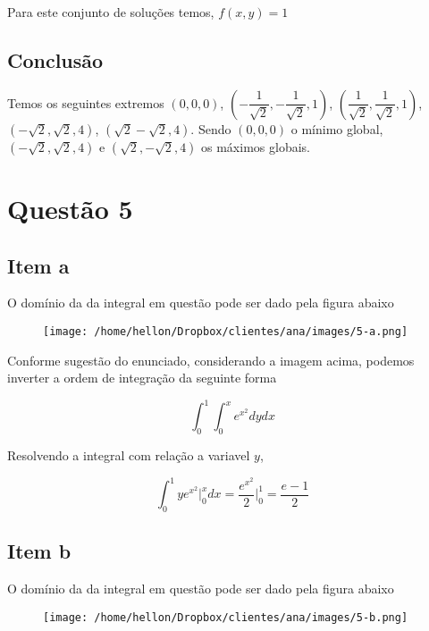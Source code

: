\documentclass[
	article,			%
	11pt,				%
	oneside,			%
	a4paper,			%
	english,			%
	brazil,				%
	sumario=tradicional
	]{abntex2}
\begin{document}
	Para este conjunto de soluções temos, $f(x,y)=1$

	\subsection*{Conclusão}

	Temos os seguintes extremos $(0,0,0)$, $\left(-\dfrac{1}{\sqrt{2}},-\dfrac{1}{\sqrt{2}},1\right)$,
	$\left(\dfrac{1}{\sqrt{2}},\dfrac{1}{\sqrt{2}},1\right)$,
	$\left(-\sqrt{2}, \sqrt{2}, 4 \right)$, $\left(\sqrt{2}  -\sqrt{2}, 4 \right)$.	Sendo $(0,0,0)$ o mínimo global, $\left(-\sqrt{2}, \sqrt{2}, 4 \right)$ e $\left(\sqrt{2}, -\sqrt{2}, 4 \right)$
	os máximos globais.



	\section*{Questão 5}
		\subsection*{Item a}
			O domínio da da integral em questão pode ser dado pela figura abaixo

			\begin{figure}[!ht]
				\centering
				\texttt{[image: /home/hellon/Dropbox/clientes/ana/images/5-a.png]}
			\end{figure}

			Conforme sugestão do enunciado, considerando a imagem acima, podemos inverter a ordem de integração da seguinte forma

			$$\int _{0}^{1}\int _{0}^{x}e^{x^{2}}dydx$$

			Resolvendo a integral com relação a variavel $y$,

			$$\int _{0}^{1}ye^{x^{2}}\biggr\rvert_{0}^{x}dx = \dfrac{e^{x^{2}}}{2}\biggr\rvert_{0}^{1} = \dfrac {e-1}{2} $$

		\subsection*{Item b}

		O domínio da da integral em questão pode ser dado pela figura abaixo


		\begin{figure}[!ht]
			\centering
			\texttt{[image: /home/hellon/Dropbox/clientes/ana/images/5-b.png]}
		\end{figure}
\end{document}
